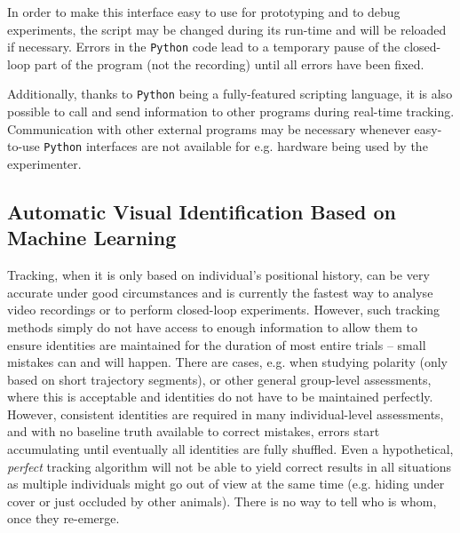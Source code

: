 \documentclass[9pt,lineno]{elife}
\begin{document}
In order to make this interface easy to use for prototyping and to debug experiments, the script may be changed during its run-time and will be reloaded if necessary. Errors in the \verb!Python! code lead to a temporary pause of the closed-loop part of the program (not the recording) until all errors have been fixed.

Additionally, thanks to \verb!Python! being a fully-featured scripting language, it is also possible to call and send information to other programs during real-time tracking. Communication with other external programs may be necessary whenever easy-to-use \verb!Python! interfaces are not available for e.g. hardware being used by the experimenter.


\subsection{Automatic Visual Identification Based on Machine Learning} \label{sec:visual_recognition}

Tracking, when it is only based on individual's positional history, can be very accurate under good circumstances and is currently the fastest way to analyse video recordings or to perform closed-loop experiments. However, such tracking methods simply do not have access to enough information to allow them to ensure identities are maintained for the duration of most entire trials -- small mistakes can and will happen. There are cases, e.g. when studying polarity (only based on short trajectory segments), or other general group-level assessments, where this is acceptable and identities do not have to be maintained perfectly. However, consistent identities are required in many individual-level assessments, and with no baseline truth available to correct mistakes, errors start accumulating until eventually all identities are fully shuffled. Even a hypothetical, \emph{perfect} tracking algorithm will not be able to yield correct results in all situations as multiple individuals might go out of view at the same time (e.g. hiding under cover or just occluded by other animals). There is no way to tell who is whom, once they re-emerge.
\end{document}
